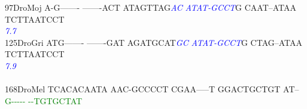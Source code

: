 \documentclass[11pt,twoside,reqno,a4paper]{article}
\begin{document}
{97\hspace*{2\charwidth}DroMoj	A-G-------	-------ACT	ATAGTTAG\textit{\textcolor{Blue}{A}}\textit{\textcolor{Blue}{C}}	\textit{\textcolor{Blue}{A}}\textit{\textcolor{Blue}{T}}\textit{\textcolor{Blue}{A}}\textit{\textcolor{Blue}{T}}\textit{\textcolor{Blue}{-}}\textit{\textcolor{Blue}{G}}\textit{\textcolor{Blue}{C}}\textit{\textcolor{Blue}{C}}\textit{\textcolor{Blue}{T}}G	CAAT--ATAA	TCTTAATCCT	\\
\hspace*{4\charwidth}\hspace*{7\charwidth}\hspace*{1\charwidth}\hspace*{1\charwidth}\hspace*{28\charwidth}\textit{\textcolor{Blue}{7.7}}\hspace*{1\charwidth}\hspace*{1\charwidth}\hspace*{1\charwidth}\hspace*{1\charwidth}\\
125\hspace*{1\charwidth}DroGri	ATG-------	-------GAT	AGATGCAT\textit{\textcolor{Blue}{G}}\textit{\textcolor{Blue}{C}}	\textit{\textcolor{Blue}{A}}\textit{\textcolor{Blue}{T}}\textit{\textcolor{Blue}{A}}\textit{\textcolor{Blue}{T}}\textit{\textcolor{Blue}{-}}\textit{\textcolor{Blue}{G}}\textit{\textcolor{Blue}{C}}\textit{\textcolor{Blue}{C}}\textit{\textcolor{Blue}{T}}G	CTAG--ATAA	TCTTAATCCT	\\
\hspace*{4\charwidth}\hspace*{7\charwidth}\hspace*{1\charwidth}\hspace*{1\charwidth}\hspace*{28\charwidth}\textit{\textcolor{Blue}{7.9}}\hspace*{1\charwidth}\hspace*{1\charwidth}\hspace*{1\charwidth}\hspace*{1\charwidth}\\
\\
168\hspace*{1\charwidth}DroMel	TCACACAATA	AAC-GCCCCT	CGAA-----T	GGACTGCTGT	AT--\textcolor{Green}{G}\textcolor{Green}{-}\textcolor{Green}{-}\textcolor{Green}{-}\textcolor{Green}{-}\textcolor{Green}{-}	\textcolor{Green}{-}\textcolor{Green}{-}\textcolor{Green}{T}\textcolor{Green}{G}\textcolor{Green}{T}\textcolor{Green}{G}\textcolor{Green}{C}\textcolor{Green}{T}\textcolor{Green}{A}\textcolor{Green}{T}	\\
}
\end{document}
